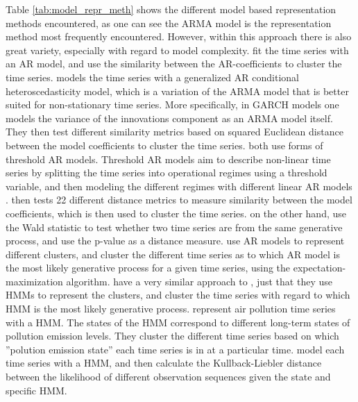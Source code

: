 Table \ref{tab:model_repr_meth} shows the different model based representation methods encountered, 
as one can see the ARMA model is the representation method most frequently encountered. 
However, within this approach there is also great variety, especially with regard to model complexity.
\textcite{shape_feat_mod_tsc_rfa, struct_damage_ar_fuzzy_c_means, ar_metric_trimmed_fuzzy_tsc_pm10, tsc_ar_metric_air_pollution} fit the time series with an AR model, and use the similarity between the AR-coefficients to cluster the time series. 
\textcite{garch_robust_tsc} models the time series with a generalized AR conditional heteroscedasticity model, which is a variation of the ARMA model that is better suited for non-stationary time series. 
More specifically, in GARCH models one models the variance of the innovations component as an ARMA model itself. 
They then test different similarity metrics based on squared Euclidean distance between the model coefficients to cluster the time series. 
\textcite{temporal_tsc_threshold_ar_models, fstar_hac_tsc} both use forms of threshold AR models. 
Threshold AR models aim to describe non-linear time series by splitting the time series into operational regimes using a threshold variable, and then modeling the different regimes with different linear AR models \cite{temporal_tsc_threshold_ar_models}. \textcite{temporal_tsc_threshold_ar_models} then tests 22 different distance metrics to measure similarity between the model coefficients, which is then used to cluster the time series. \textcite{fstar_hac_tsc} on the other hand, use the Wald statistic to test whether two time series are from the same generative process, and use the p-value as a distance measure.
\textcite{moar_mpl_tsc} use AR models to represent different clusters, and cluster the different time series as to which AR model is the most likely generative process for a given time series, using the expectation-maximization algorithm.
\textcite{mixture_gaussian_hmm} have a very similar approach to \textcite{moar_mpl_tsc}, just that they use HMMs to represent the clusters, and cluster the time series with regard to which HMM is the most likely generative process. 
\textcite{hmm_pm10_quantifying_impacts} represent air pollution time series with a HMM. 
The states of the HMM correspond to different long-term states of pollution emission levels.
They cluster the different time series based on which ''polution emission state'' each time series is in at a particular time. 
\textcite{multivariate_tsc_hmm} model each time series with a HMM, and then calculate the Kullback-Liebler distance between the likelihood of different observation sequences given the state and specific HMM. 
